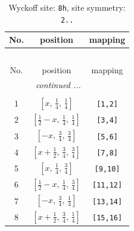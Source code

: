 \documentclass[fleqn,8pt]{jsarticle}
\begin{document}
\begin{longtable}{ccc}
\caption{Wyckoff site: {\tt 8h}, site symmetry: {\tt 2..}}
 \\
 \hline \hline
No. & position & mapping \\ \hline \endfirsthead

\multicolumn{2}{l}{\tablename\ \thetable{}} \\
 \hline \hline
No. & position & mapping \\ \hline \endhead

 \hline \hline
\multicolumn{2}{r}{\footnotesize\it continued ...} \\ \endfoot

 \hline \hline
\multicolumn{2}{r}{} \\ \endlastfoot

1 & $\left[ x,\, \frac{1}{4},\, \frac{1}{4} \right]$ & {\tt [1,2]} \\ \hline
2 & $\left[ \frac{1}{2} - x,\, \frac{1}{4},\, \frac{1}{4} \right]$ & {\tt [3,4]} \\ \hline
3 & $\left[ - x,\, \frac{3}{4},\, \frac{3}{4} \right]$ & {\tt [5,6]} \\ \hline
4 & $\left[ x + \frac{1}{2},\, \frac{3}{4},\, \frac{3}{4} \right]$ & {\tt [7,8]} \\ \hline
5 & $\left[ x,\, \frac{1}{4},\, \frac{3}{4} \right]$ & {\tt [9,10]} \\ \hline
6 & $\left[ \frac{1}{2} - x,\, \frac{1}{4},\, \frac{3}{4} \right]$ & {\tt [11,12]} \\ \hline
7 & $\left[ - x,\, \frac{3}{4},\, \frac{1}{4} \right]$ & {\tt [13,14]} \\ \hline
8 & $\left[ x + \frac{1}{2},\, \frac{3}{4},\, \frac{1}{4} \right]$ & {\tt [15,16]} \\
\end{longtable}
\renewcommand{\arraystretch}{1.2}
\end{document}
